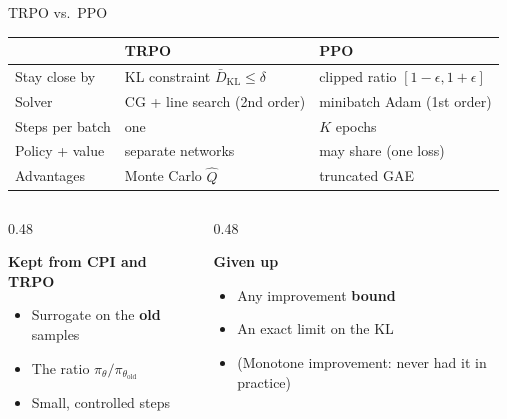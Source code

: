 \documentclass[aspectratio=169]{beamer}
\newcommand{\told}{\theta_{\mathrm{old}}}
\begin{document}
\begin{frame}{TRPO vs.\ PPO}
  \begin{center}
  \renewcommand{\arraystretch}{1.3}
  \small
  \begin{tabular}{l l l}
    \toprule
     & \textbf{TRPO} & \textbf{\color{AtlasCool}PPO} \\
    \midrule
    Stay close by & KL constraint $\bar D_{\mathrm{KL}}\le\delta$ & clipped ratio $[1-\epsilon,1+\epsilon]$ \\
    Solver & CG + line search (2nd order) & minibatch Adam (1st order) \\
    Steps per batch & one & $K$ epochs \\
    Policy + value & separate networks & may share (one loss) \\
    Advantages & Monte Carlo $\hat Q$ & truncated GAE \\
    \bottomrule
  \end{tabular}
  \end{center}
  \vspace{2pt}
  \begin{columns}[t]
    \begin{column}{0.48\textwidth}
      \begin{goodbox}
        \small\textbf{Kept from CPI and TRPO}
        \begin{itemize}
          \item Surrogate on the \textbf{old} samples
          \item The ratio $\pi_\theta/\pi_{\told}$
          \item Small, controlled steps
        \end{itemize}
      \end{goodbox}
    \end{column}
    \begin{column}{0.48\textwidth}
      \begin{badbox}
        \small\textbf{Given up}
        \begin{itemize}
          \item Any improvement \textbf{bound}
          \item An exact limit on the KL
          \item (Monotone improvement: never had it in practice)
        \end{itemize}
      \end{badbox}
    \end{column}
  \end{columns}
\end{frame}
\end{document}
